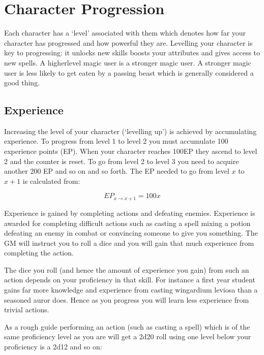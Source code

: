 
\chapter{Character Progression}

	
Each character has a `level' associated with them\comma{} which denotes how far your character has progressed\comma{} and how powerful they are.  Levelling your character is key to progressing: it unlocks new skills\comma{} boosts your attributes\comma{} and gives access to new spells. A higher\minus{}level magic user is a stronger magic user. A stronger magic user is less likely to get eaten by a passing beast\comma{} which is generally considered a good thing. 

\section{Experience}

Increasing the level of your character (`levelling up') is achieved by accumulating experience. To progress from level 1 to level 2\comma{} you must accumulate 100 experience points (EP). When your character reaches 100EP\comma{} they ascend to level 2\comma{} and the counter is reset. To go from level 2 to level 3 you need to acquire another 200 EP\comma{} and so on and so forth. The EP needed to go from level $x$ to $x+1$ is calculated from:

$$ EP_{x \to x + 1} = 100 x $$

Experience is gained by completing actions and defeating enemies. Experience is awarded for completing difficult actions such as casting a spell\comma{} mixing a potion\comma{} defeating an enemy in combat\comma{} or convincing someone to give you something. The GM will instruct you to roll a dice\comma{} and you will gain that much experience from completing the action.

The dice you roll (and hence the amount of experience you gain) from such an action depends on your proficiency in that skill. For instance\comma{} a first year student gains far more knowledge and experience from casting wingardium leviosa than a seasoned auror does. Hence\comma{} as you progress\comma{} you will learn less experience from trivial actions. 

As a rough guide\comma{} performing an action (such as casting a spell) which is of the same proficiency level as you are will get a 2d20 roll\comma{} using one level below your proficiency is a 2d12\comma{} and so on:

